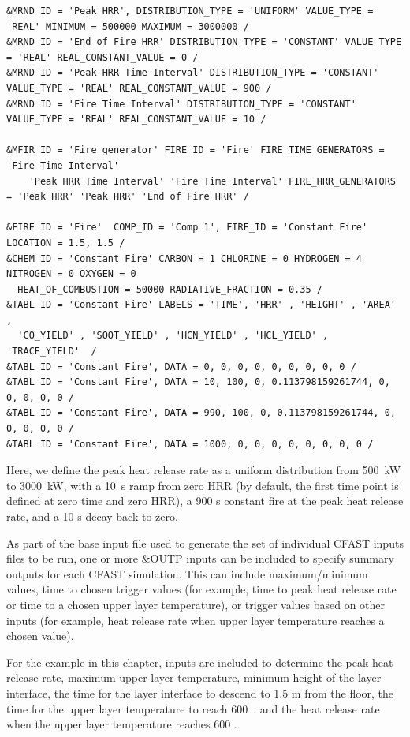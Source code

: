 \documentclass[12pt,twoside]{book}
\begin{document}
\begin{lstlisting}[basicstyle=\scriptsize]
&MRND ID = 'Peak HRR', DISTRIBUTION_TYPE = 'UNIFORM' VALUE_TYPE = 'REAL' MINIMUM = 500000 MAXIMUM = 3000000 /
&MRND ID = 'End of Fire HRR' DISTRIBUTION_TYPE = 'CONSTANT' VALUE_TYPE = 'REAL' REAL_CONSTANT_VALUE = 0 /
&MRND ID = 'Peak HRR Time Interval' DISTRIBUTION_TYPE = 'CONSTANT' VALUE_TYPE = 'REAL' REAL_CONSTANT_VALUE = 900 /
&MRND ID = 'Fire Time Interval' DISTRIBUTION_TYPE = 'CONSTANT' VALUE_TYPE = 'REAL' REAL_CONSTANT_VALUE = 10 /

&MFIR ID = 'Fire_generator' FIRE_ID = 'Fire' FIRE_TIME_GENERATORS = 'Fire Time Interval'
    'Peak HRR Time Interval' 'Fire Time Interval' FIRE_HRR_GENERATORS = 'Peak HRR' 'Peak HRR' 'End of Fire HRR' /

&FIRE ID = 'Fire'  COMP_ID = 'Comp 1', FIRE_ID = 'Constant Fire'  LOCATION = 1.5, 1.5 /
&CHEM ID = 'Constant Fire' CARBON = 1 CHLORINE = 0 HYDROGEN = 4 NITROGEN = 0 OXYGEN = 0
  HEAT_OF_COMBUSTION = 50000 RADIATIVE_FRACTION = 0.35 /
&TABL ID = 'Constant Fire' LABELS = 'TIME', 'HRR' , 'HEIGHT' , 'AREA' ,
  'CO_YIELD' , 'SOOT_YIELD' , 'HCN_YIELD' , 'HCL_YIELD' , 'TRACE_YIELD'  /
&TABL ID = 'Constant Fire', DATA = 0, 0, 0, 0, 0, 0, 0, 0, 0 /
&TABL ID = 'Constant Fire', DATA = 10, 100, 0, 0.113798159261744, 0, 0, 0, 0, 0 /
&TABL ID = 'Constant Fire', DATA = 990, 100, 0, 0.113798159261744, 0, 0, 0, 0, 0 /
&TABL ID = 'Constant Fire', DATA = 1000, 0, 0, 0, 0, 0, 0, 0, 0 /
\end{lstlisting}

Here, we define the peak heat release rate as a uniform distribution from 500~kW to 3000~kW, with a 10~s ramp from zero HRR (by default, the first time point is defined at zero time and zero HRR), a 900 s constant fire at the peak heat release rate, and a 10 s decay back to zero.

As part of the base input file used to generate the set of individual CFAST inputs files to be run, one or more {\ct \&OUTP} inputs can be included to specify summary outputs for each CFAST simulation. This can include maximum/minimum values, time to chosen trigger values (for example, time to peak heat release rate or time to a chosen upper layer temperature), or trigger values based on other inputs (for example, heat release rate when upper layer temperature reaches a chosen value).

For the example in this chapter, inputs are included to determine the peak heat release rate, maximum upper layer temperature, minimum height of the layer interface, the time for the layer interface to descend to 1.5 m from the floor, the time for the upper layer temperature to reach 600~\degc. and the heat release rate when the upper layer temperature reaches 600 \degc.
\end{document}
